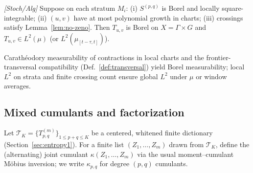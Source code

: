 \begin{lemma}\label{lem:meas-3}
\emph{[\textup{Stoch/Alg}]} Suppose on each stratum $M_i$: (i) $S^{(p,q)}$ is Borel and locally square-integrable; (ii) $(u,v)$ have at most polynomial growth in charts; (iii) crossings satisfy Lemma~\ref{lem:no-zeno}. Then $T_{u,v}$ is Borel on $X=\Gamma\times G$ and $T_{u,v}\in L^2(\mu)$ (or $L^2(\mu_{[t-\tau,t]})$).
\begin{proofsketch}
Carath\'eodory measurability of contractions in local charts and the frontier-transversal compatibility (Def.~\ref{def:transversal}) yield Borel measurability; local $L^2$ on strata and finite crossing count ensure global $L^2$ under $\mu$ or window averages.
\end{proofsketch}
\end{lemma}

\subsection{Mixed cumulants and factorization}\label{subsec:cumulants}

Let $\mathcal T_K=\{T^{(m)}_{p,q}\}_{1\le p+q\le K}$ be a centered, whitened finite dictionary (Section~\ref{sec:entropy1}). For a finite list $(Z_1,\ldots,Z_m)$ drawn from $\mathcal T_K$, define the (alternating) joint cumulant $\kappa(Z_1,\ldots,Z_m)$ via the usual moment--cumulant M\"obius inversion; we write $\kappa_{p,q}$ for degree $(p,q)$ cumulants.

